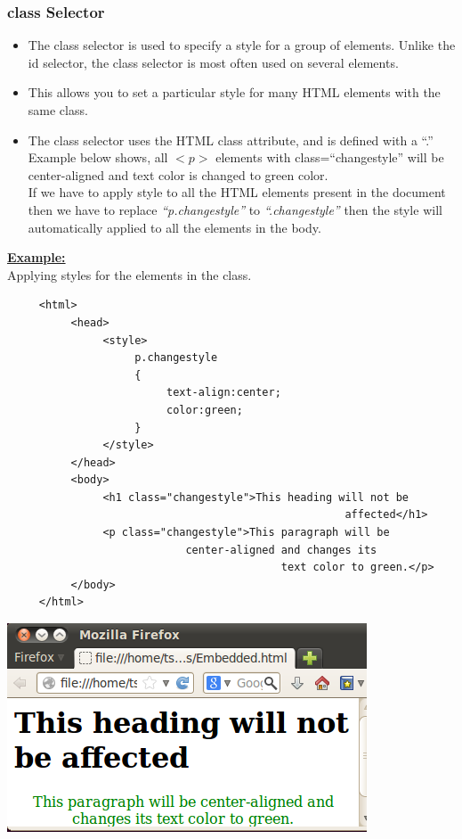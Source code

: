 \documentclass[11pt,a4paper]{article}
\begin{document}
\subsubsection*{class Selector}
\begin{itemize}
\item The class selector is used to specify a style for a group of elements. Unlike the id selector, the class selector is most often used on several elements.
\item This allows you to set a particular style for many HTML elements with the same class.
\item The class selector uses the HTML class attribute, and is defined with a ``.''\\

Example below shows, all $<p>$ elements with class=``changestyle'' will be center-aligned and text color is changed to green color.\\

If we have to apply style to all the HTML elements present in the document then we have to replace \emph{``p.changestyle''} to \emph{``.changestyle''} then the style will automatically applied to all the elements in the body.
\end{itemize}
\underline{\textbf{Example:}}\\

Applying styles for the elements in the class.
\begin{verbatim}
     <html>
          <head>
               <style>
                    p.changestyle
                    {
                         text-align:center;
                         color:green;
                    }
               </style>
          </head>
          <body>
               <h1 class="changestyle">This heading will not be
                                                     affected</h1>
               <p class="changestyle">This paragraph will be 
                            center-aligned and changes its 
                                           text color to green.</p> 
          </body>
     </html>
\end{verbatim}
\begin{center}
\includegraphics[scale=0.6]{ClassSelector}
\end{center}
\end{document}
